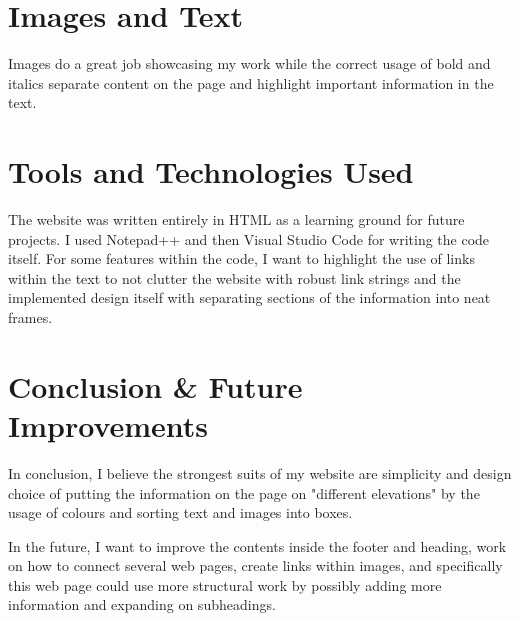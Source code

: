 \documentclass[twoside]{article}
\begin{document}
\section*{Images and Text}
Images do a great job showcasing my work while the correct usage of bold and italics separate content on the page and highlight important information in the text.

\section*{Tools and Technologies Used}
\noindent The website was written entirely in HTML as a learning ground for future projects. I used Notepad++ and then Visual Studio Code for writing the code itself. For some features within the code, I want to highlight the use of links within the text to not clutter the website with robust link strings and the implemented design itself with separating sections of the information into neat frames.

\section*{Conclusion \& Future Improvements}
In conclusion, I believe the strongest suits of my website are simplicity and design choice of putting the information on the page on "different elevations" by the usage of colours and sorting text and images into boxes. 

\vspace{1em}

\noindent In the future, I want to improve the contents inside the footer and heading, work on how to connect several web pages, create links within images, and specifically this web page could use more structural work by possibly adding more information and expanding on subheadings.
\end{document}
